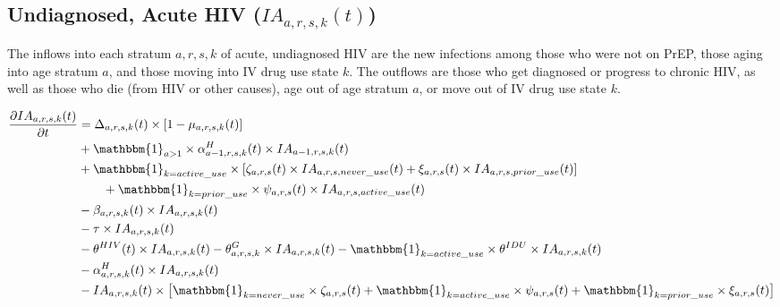 \documentclass{article}
\begin{document}
\subsection{Undiagnosed, Acute HIV \big($IA_{a,r,s,k}(t)$\big)}

The inflows into each stratum $a,r,s,k$ of acute, undiagnosed HIV are the new infections among those who were not on PrEP, those aging into age stratum $a$, and those moving into IV drug use state $k$. The outflows are those who get diagnosed or progress to chronic HIV, as well as those who die (from HIV or other causes), age out of age stratum $a$, or move out of IV drug use state $k$.

\begin{align*}
\frac{\partial IA_{a,r,s,k}(t)}{\partial t} 
&= \Delta_{a,r,s,k}(t) \times [1-\mu_{a,r,s,k}(t)]\\
&+ \mathbbm{1}_{a>1} \times \alpha_{a-1,r,s,k}^H(t) \times IA_{a-1,r,s,k}(t) \\
&+ \mathbbm{1}_{k=active\_use} \times [\zeta_{a,r,s}(t) \times IA_{a,r,s,never\_use}(t) + \xi_{a,r,s}(t) \times IA_{a,r,s,prior\_use}(t)]\\
&\qquad + \mathbbm{1}_{k=prior\_use} \times \psi_{a,r,s}(t) \times IA_{a,r,s,active\_use}(t)\\
&- \beta_{a,r,s,k}(t) \times IA_{a,r,s,k}(t) \\
&- \tau \times IA_{a,r,s,k}(t) \\
&- \theta^{HIV}(t) \times IA_{a,r,s,k}(t)  
- \theta^G_{a,r,s,k} \times IA_{a,r,s,k}(t) 
- \mathbbm{1}_{k=active\_use} \times \theta^{IDU} \times IA_{a,r,s,k}(t) \\
&- \alpha_{a,r,s,k}^H(t) \times IA_{a,r,s,k}(t) \\
&- IA_{a,r,s,k}(t) \times \big[\mathbbm{1}_{k=never\_use} \times \zeta_{a,r,s}(t) + \mathbbm{1}_{k=active\_use} \times \psi_{a,r,s}(t) + \mathbbm{1}_{k=prior\_use} \times \xi_{a,r,s}(t)\big]
\end{align*}
\end{document}
